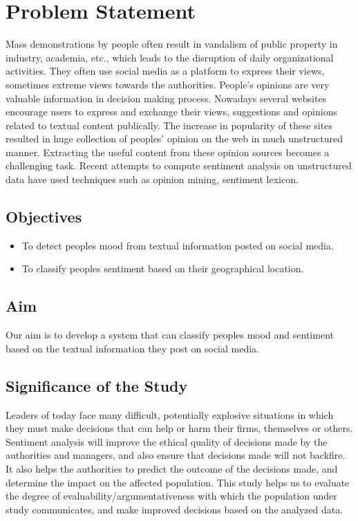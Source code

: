 

\chapter{Problem Statement}
Mass demonstrations by people often result in vandalism of public property in industry, academia, etc., which leads to the disruption of daily organizational activities. They often use social media as a platform to express their views, sometimes extreme views towards the authorities. People’s opinions are very valuable information in decision making process. Nowadays several websites encourage users to express and exchange their views, suggestions and opinions related to textual content publically. The increase in popularity of these sites resulted in huge collection of peoples’ opinion on the web in much unstructured manner. Extracting the useful content from these opinion sources becomes a challenging task. Recent attempts to compute sentiment analysis on unstructured data have used techniques such as opinion mining, sentiment lexicon.

\section{Objectives}

\begin{itemize}
\item To detect people\textquotesingle s mood from textual information posted on social media.
\item To classify people\textquotesingle s sentiment based on their geographical location.
\end{itemize}

\section{Aim}

Our aim is to develop a system that can classify people\textquotesingle s mood and sentiment based on the textual information they post on social media.



\section{Significance of the Study}
Leaders of today face many difficult, potentially explosive situations in which they must make decisions that can help or harm their firms, themselves or others. Sentiment analysis will improve the ethical quality of decisions made by the authorities and managers, and also ensure that decisions made will not backfire. It also helps the authorities to predict the outcome of the decisions made, and determine the impact on the affected population. This study helps us to evaluate the degree of evaluability/argumentativeness with which the population under study communicates,\cite{ref5} and make improved decisions based on the analyzed data.



